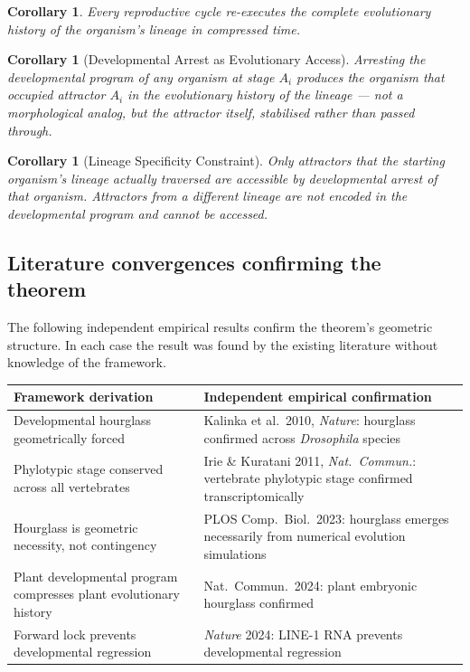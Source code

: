 \documentclass[12pt, a4paper]{article}
\newtheorem{corollary}[theorem]{Corollary}
\theoremstyle{definition}
\theoremstyle{remark}
\begin{document}
\begin{corollary}
Every reproductive cycle re-executes the complete
evolutionary history of the organism's lineage in compressed
time.
\end{corollary}

\begin{corollary}[Developmental Arrest as Evolutionary Access]
Arresting the developmental program of any organism at stage
$A_i$ produces the organism that occupied attractor $A_i$ in
the evolutionary history of the lineage --- not a
morphological analog, but the attractor itself, stabilised
rather than passed through.
\end{corollary}

\begin{corollary}[Lineage Specificity Constraint]
Only attractors that the starting organism's lineage actually
traversed are accessible by developmental arrest of that
organism. Attractors from a different lineage are not encoded
in the developmental program and cannot be accessed.
\end{corollary}

\subsection{Literature convergences confirming the theorem}

The following independent empirical results confirm the
theorem's geometric structure. In each case the result was
found by the existing literature without knowledge of the
framework.

\begin{center}
\begin{tabular}{p{5.5cm}p{6cm}}
\toprule
\textbf{Framework derivation} &
\textbf{Independent empirical confirmation} \\
\midrule
Developmental hourglass geometrically forced
  & Kalinka et al.\ 2010, \textit{Nature}:
    hourglass confirmed across \textit{Drosophila} species \\
Phylotypic stage conserved across all vertebrates
  & Irie \& Kuratani 2011, \textit{Nat.\ Commun.}:
    vertebrate phylotypic stage confirmed transcriptomically \\
Hourglass is geometric necessity, not contingency
  & PLOS Comp.\ Biol.\ 2023: hourglass emerges necessarily
    from numerical evolution simulations \\
Plant developmental program compresses plant
evolutionary history
  & Nat.\ Commun.\ 2024: plant embryonic hourglass
    confirmed \cite{plant_hourglass2024} \\
Forward lock prevents developmental regression
  & \textit{Nature} 2024: LINE-1 RNA prevents
    developmental regression \cite{line1_2024} \\
\bottomrule
\end{tabular}
\end{center}
\end{document}
